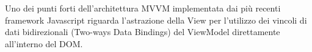 \noindent
Uno dei punti forti dell'architettura MVVM implementata dai più recenti framework Javascript riguarda l'astrazione della View per l'utilizzo dei vincoli di dati bidirezionali (Two-ways Data Bindings) del ViewModel direttamente all'interno del DOM.


